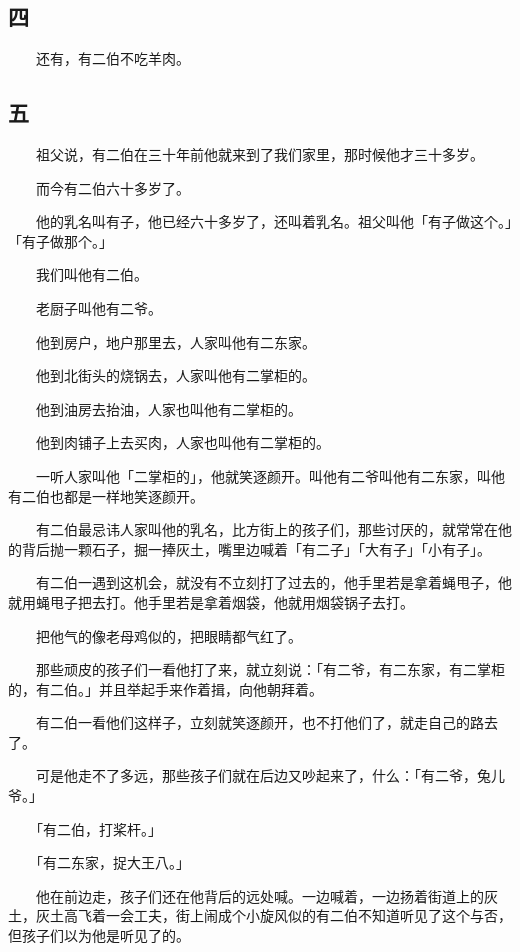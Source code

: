 \documentclass[UTF8]{ctexart}
\begin{document}
\subsection{四}

　　还有，有二伯不吃羊肉。

\subsection{五}

　　祖父说，有二伯在三十年前他就来到了我们家里，那时候他才三十多岁。

　　而今有二伯六十多岁了。

　　他的乳名叫有子，他已经六十多岁了，还叫着乳名。祖父叫他「有子做这个。」「有子做那个。」

　　我们叫他有二伯。

　　老厨子叫他有二爷。

　　他到房户，地户那里去，人家叫他有二东家。

　　他到北街头的烧锅去，人家叫他有二掌柜的。

　　他到油房去抬油，人家也叫他有二掌柜的。

　　他到肉铺子上去买肉，人家也叫他有二掌柜的。

　　一听人家叫他「二掌柜的」，他就笑逐颜开。叫他有二爷叫他有二东家，叫他有二伯也都是一样地笑逐颜开。

　　有二伯最忌讳人家叫他的乳名，比方街上的孩子们，那些讨厌的，就常常在他的背后抛一颗石子，掘一捧灰土，嘴里边喊着「有二子」「大有子」「小有子」。

　　有二伯一遇到这机会，就没有不立刻打了过去的，他手里若是拿着蝇甩子，他就用蝇甩子把去打。他手里若是拿着烟袋，他就用烟袋锅子去打。

　　把他气的像老母鸡似的，把眼睛都气红了。

　　那些顽皮的孩子们一看他打了来，就立刻说：「有二爷，有二东家，有二掌柜的，有二伯。」并且举起手来作着揖，向他朝拜着。

　　有二伯一看他们这样子，立刻就笑逐颜开，也不打他们了，就走自己的路去了。

　　可是他走不了多远，那些孩子们就在后边又吵起来了，什么：「有二爷，兔儿爷。」

　　「有二伯，打桨杆。」

　　「有二东家，捉大王八。」

　　他在前边走，孩子们还在他背后的远处喊。一边喊着，一边扬着街道上的灰土，灰土高飞着一会工夫，街上闹成个小旋风似的有二伯不知道听见了这个与否，但孩子们以为他是听见了的。
\end{document}

